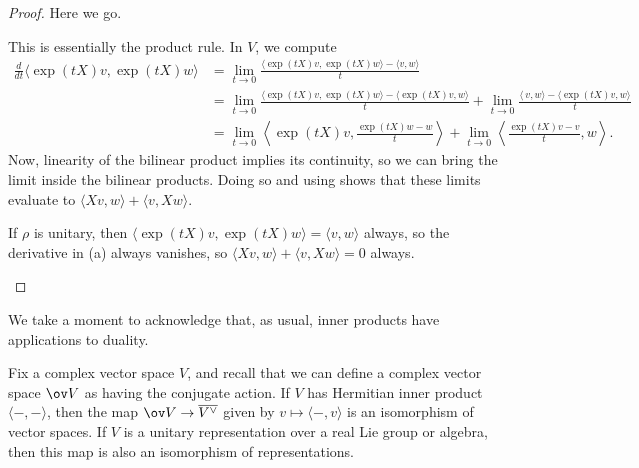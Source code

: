 \documentclass[../notes.tex]{subfiles}
\begin{document}
\begin{proof}
	Here we go.
	\begin{listalph}
		\item This is essentially the product rule. In $V$, we compute
		\begin{align*}
			\frac d{dt}\langle\exp(tX)v,\exp(tX)w\rangle &= \lim_{t\to0}\frac{\langle\exp(tX)v,\exp(tX)w\rangle-\langle v,w\rangle}{t} \\
			&= \lim_{t\to0}\frac{\langle\exp(tX)v,\exp(tX)w\rangle-\langle\exp(tX)v,w\rangle}{t}+\lim_{t\to0}\frac{\langle\ v,w\rangle-\langle\exp(tX)v,w\rangle}{t} \\
			&= \lim_{t\to0}\left\langle\exp(tX)v,\frac{\exp(tX)w-w}t\right\rangle+\lim_{t\to0}\left\langle\frac{\exp(tX)v-v}t,w\right\rangle.
		\end{align*}
		Now, linearity of the bilinear product implies its continuity, so we can bring the limit inside the bilinear products. Doing so and using  shows that these limits evaluate to $\langle Xv,w\rangle+\langle v,Xw\rangle$.
		\item If $\rho$ is unitary, then $\langle\exp(tX)v,\exp(tX)w\rangle=\langle v,w\rangle$ always, so the derivative in (a) always vanishes, so $\langle Xv,w\rangle+\langle v,Xw\rangle=0$ always.
		\qedhere
	\end{listalph}
\end{proof}
We take a moment to acknowledge that, as usual, inner products have applications to duality.
\begin{lemma} \label{lem:dualize-unitary-rep}
	Fix a complex vector space $V$, and recall that we can define a complex vector space $\ov V$ as having the conjugate action. If $V$ has Hermitian inner product $\langle-,-\rangle$, then the map $\ov V\to\overline{V^\lor}$ given by $v\mapsto\langle-,v\rangle$ is an isomorphism of vector spaces. If $V$ is a unitary representation over a real Lie group or algebra, then this map is also an isomorphism  of representations.
\end{lemma}
\end{document}
